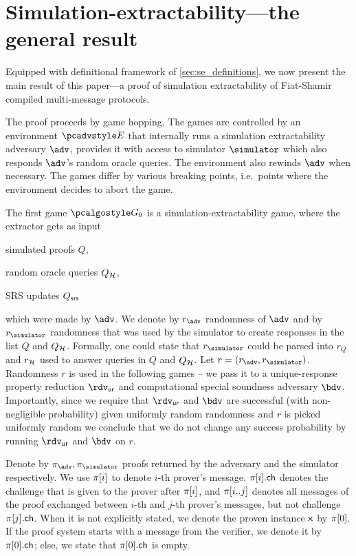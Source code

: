 \section{Simulation-extractability---the general result}
\label{sec:general}
Equipped with definitional framework of \cref{sec:se_definitions}, we now present the
main result of this paper---a proof of simulation extractability of
Fiat-Shamir compiled multi-message protocols.

The proof proceeds by game hopping. The games are controlled by an environment $\env$ that
internally runs a simulation extractability adversary $\advse$, provides it with access to
simulator $\simulator$ which also responds $\adv$'s random oracle queries. The environment
also rewinds $\adv$ when necessary. The games differ by various breaking points,
i.e.~points where the environment decides to abort the game.

The first game $\game{0}$ is a simulation-extractability game, where the extractor
gets as input
\begin{inparaenum}[(1)]
\item simulated proofs $Q$,
\item random oracle queries $Q_{\mathcal{H}}$,
\item SRS updates $Q_{\mathsf{srs}}$
\end{inparaenum}
which were made by $\advse$.  We denote by $\radv$ randomness of $\advse$ and by
$\rsim$ randomness that was used by the simulator to create responses in the list $Q$
and $Q_{\mathcal{H}}$. Formally, one could state that $\rsim$ could be parsed into $r_Q$ and
$r_{\mathcal{H}}$ used to answer queries in $Q$ and $Q_{\mathcal{H}}$. Let $r = (\radv,
\rsim)$. Randomness $r$ is used in the following games -- we pass it to a
unique-response property reduction $\rdvur$ and computational special soundness adversary
$\bdv$. Importantly, since we require that $\rdvur$ and $\bdv$ are successful (with
non-negligible probability) given uniformly random randomness and $r$ is picked
uniformly random we conclude that we do not change any success probability by running
$\rdvur$ and $\bdv$ on $r$.

Denote by $\zkproof_{\advse}, \zkproof_{\simulator}$ proofs returned by the adversary
and the simulator respectively. We use $\pi[i]$ to denote $i$-th prover's
message. $\pi[i].\mathsf{ch}$ denotes the challenge that is given to the prover after
$\pi[i]$, and $\pi[i..j]$ denotes all messages of the proof exchanged
between $i$-th and $j$-th prover's messages, but not challenge
$\pi[j].\mathsf{ch}$. When it is not explicitly stated, we denote the proven instance
$\mathsf{x}$ by $\pi[0]$. If the proof system starts with a message from the verifier,
we denote it by $\pi[0].\mathsf{ch}$; else, we state that $\pi[0].\mathsf{ch}$ is empty.

